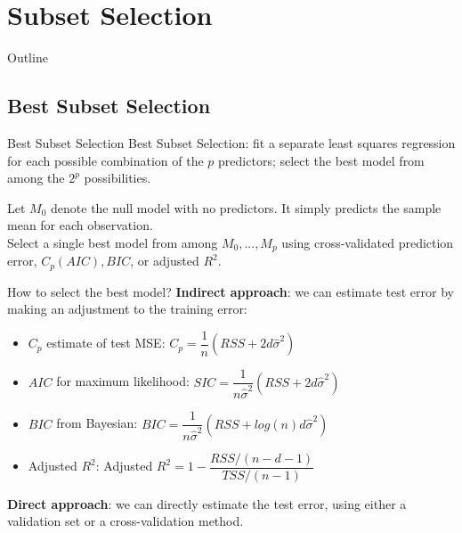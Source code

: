 \documentclass{beamer}
\begin{document}
	\section{Subset Selection}
	
	\begin{frame}{Outline}
		\tableofcontents[currentsection]
	\end{frame}

	\subsection{Best Subset Selection}
	
	\begin{frame}{Best Subset Selection}
		Best Subset Selection: ﬁt a separate least squares regression for each possible combination of the $p$ predictors; select the best model from among the $2^p$ possibilities.
		\begin{algorithm}[H]
			\caption{Best Sample Selection}
			Let $M_0$ denote the null model with no predictors. It simply predicts the sample mean for each observation. \\
			Select a single best model from among $M_0, . . . , M_p$ using cross-validated prediction error, $C_p (AIC), BIC$, or adjusted $R^2$.
		\end{algorithm}
	\end{frame}
	
	\begin{frame}{How to select the best model?}
		\textbf{Indirect approach}: we can estimate test error by making an adjustment to the training error:
		\begin{itemize}
			\item $C_p$ estimate of test MSE: $C_p = \dfrac{1}{n}(RSS+2d\hat{\sigma}^2)$
			\item $AIC$ for maximum likelihood: $SIC=\dfrac{1}{n\hat{\sigma}^2}(RSS+2d\hat{\sigma}^2)$
			\item $BIC$ from Bayesian: $BIC=\dfrac{1}{n\hat{\sigma}^2}(RSS+log(n)d\hat{\sigma}^2)$
			\item Adjusted $R^2$: Adjusted $R^2 = 1-\dfrac{RSS/(n-d-1)}{TSS/(n-1)}$
		\end{itemize}
		\textbf{Direct approach}: we can directly estimate the test error, using either a validation set or a cross-validation method.
	\end{frame}
	
\end{document}
